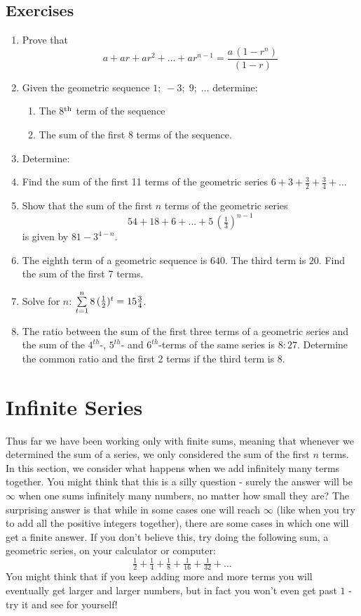 \subsection{Exercises}
\begin{enumerate}
\item Prove that $$a + ar + ar^2 + ... + ar^{n-1} = \dfrac{a\,(1 - r^n)}{(1-r)}$$
\item{Given the geometric sequence $1;\;-3;\; 9;\;\dots$ determine:
\begin{enumerate}
\item{The 8$^{\rm{th}}$ term of the sequence}
\item{The sum of the first 8 terms of the sequence.}
\end{enumerate}}
\item{Determine:
}
\item Find the sum of the first 11 terms of the geometric series $6 + 3 + \tfrac{3}{2} + \tfrac{3}{4} + \ldots$
\item Show that the sum of the first $n$ terms of the geometric series $$54 + 18 + 6 + ... + 5 \, (\tfrac{1}{3})^{n-1}$$ is given by $81 - 3^{4-n}$.
\item The eighth term of a geometric sequence is $640$. The third term is $20$. Find the sum of the first 7 terms.
\item Solve for $n$: $\sum_{t=1}^n \limits 8 \, (\tfrac{1}{2})^t = 15\tfrac{3}{4}$.
\item The ratio between the sum of the first three terms of a geometric series and the sum of the $4^{th}$-, $5^{th}$- and $6^{th}$-terms of the same series is $8:27$. Determine the common ratio and the first 2 terms if the third term is $8$.


\end{enumerate}

\section{Infinite Series}
Thus far we have been working only with finite sums, meaning that whenever we determined the sum of a series, we only considered the sum of the first $n$ terms. In this section, we consider what happens when we add infinitely many terms together. You might think that this is a silly question - surely the answer will be $\infty$ when one sums infinitely many numbers, no matter how small they are? The surprising answer is that while in some cases one will reach $\infty$ (like when you try to add all the positive integers together), there are some cases in which one will get a finite answer. If you don't believe this, try doing the following sum, a geometric series, on your calculator or computer:
$$\tfrac{1}{2} + \tfrac{1}{4} + \tfrac{1}{8} + \tfrac{1}{16} + \tfrac{1}{32} + \ldots $$
You might think that if you keep adding more and more terms you will eventually get larger and larger numbers, but in fact you won't even get past $1$ - try it and see for yourself!

